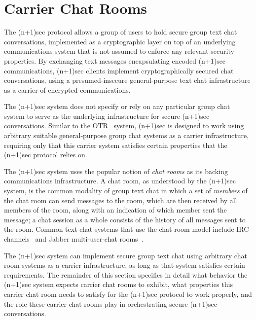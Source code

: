 \documentclass{article}
\begin{document}



\section{Carrier Chat Rooms}
\label{sec:carrier-chat-rooms}

The (n+1)sec protocol allows a group of users to hold secure group text chat conversations, implemented as a cryptographic layer on top of an underlying communications system that is not assumed to enforce any relevant security properties.
By exchanging text messages encapsulating encoded (n+1)sec communications, (n+1)sec clients implement cryptographically secured chat conversations, using a presumed-insecure general-purpose text chat infrastructure as a carrier of encrypted communications.

The (n+1)sec system does not specify or rely on any particular group chat system to serve as the underlying infrastructure for secure (n+1)sec conversations.
Similar to the OTR~\cite{otr} system, (n+1)sec is designed to work using arbitrary suitable general-purpose group chat systems as a carrier infrastructure, requiring only that this carrier system satisfies certain properties that the (n+1)sec protocol relies on.

The (n+1)sec system uses the popular notion of \emph{chat rooms} as its backing communications infrastructure.
A chat room, as understood by the (n+1)sec system, is the common modality of group text chat in which a set of \emph{members} of the chat room can send messages to the room, which are then received by all members of the room, along with an indication of which member sent the message; a chat session as a whole consists of the history of all messages sent to the room.
Common text chat systems that use the chat room model include IRC channels~\cite{irc} and Jabber multi-user-chat rooms~\cite{jabber}.

The (n+1)sec system can implement secure group text chat using arbitrary chat room systems as a carrier infrastructure, as long as that system satisfies certain requirements.
The remainder of this section specifies in detail what behavior the (n+1)sec system expects carrier chat rooms to exhibit, what properties this carrier chat room needs to satisfy for the (n+1)sec protocol to work properly, and the role these carrier chat rooms play in orchestrating secure (n+1)sec conversations.
\end{document}
